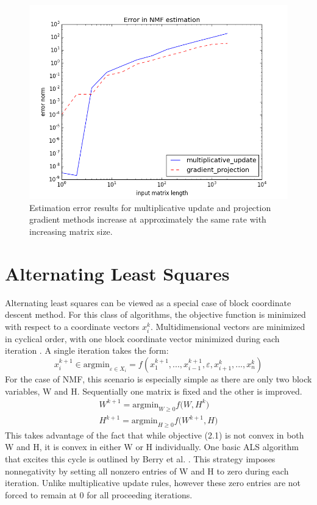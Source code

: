 \documentclass[final,leqno,onefignum,onetabnum]{siamltex1213}
\begin{document}
\begin{figure}[t!]
  \centering
    \includegraphics[width=.5\linewidth]{NMF_projection_gradient_vs_multiplicative_update_error}
  \caption{Estimation error results for multiplicative update and projection gradient methods increase at approximately the same rate with increasing matrix size.}
\end{figure}

\section{Alternating Least Squares} Alternating least squares can be viewed as a special case of block coordinate descent method. For this class of algorithms, the objective function is minimized with respect to a coordinate vectors $x^{k}_{i}$. Multidimensional vectors are minimized in cyclical order, with one block coordinate vector minimized during each iteration \cite{Ber}. A single iteration takes the form:
\begin{equation}\label{bcv1}
 x^{k+1}_{i} \in {\mathrm{argmin}_{\varepsilon \in X_i}} = f( x^{k+1}_{1}, ..., x^{k+1}_{i-1}, \varepsilon, x^{k}_{i+1}, ..., x^{k}_{n})
\end{equation}
For the case of NMF, this scenario is especially simple as there are only two block variables, W and H. Sequentially one matrix is fixed and the other is improved. 
\begin{equation}\label{bcv2}
\begin{align}
W^{k+1} = {\mathrm{argmin}_{W \ge 0} f(W,H^k}) \\
H^{k+1} = {\mathrm{argmin}_{H \ge 0} f(W^{k+1},H})
\end{align}
\end{equation}
This takes advantage of the fact that while objective (2.1) is not convex in both W and H, it is convex in either W or H individually. One basic ALS algorithm that excites this cycle is outlined by Berry et al. \cite{Ber}. This strategy imposes nonnegativity by setting all nonzero entries of W and H to zero during each iteration. Unlike multiplicative update rules, however these zero entries are not forced to remain at 0 for all proceeding iterations. \\
\end{document}
